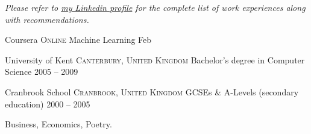 \documentclass[10pt,a4paper]{article}
\begin{document}
\begin{center}
  \emph{Please refer to \href{http://www.linkedin.com/in/sebinsua}{my Linkedin profile} for the complete list of work experiences along with recommendations.}
\end{center}


\spacedhrule{-0.2em}{-0.4em}


\headedsection
  {Coursera}
  {\textsc{Online}} {%
  \headedsubsection
    {Machine Learning}
    {Feb }
    {
  }
}

\headedsection
  {University of Kent}
  {\textsc{Canterbury, United Kingdom}} {%
  \headedsubsection
    {Bachelor's degree in Computer Science}
    {2005 -- 2009}
    {\bodytext{}
  }
}

\headedsection
  {Cranbrook School}
  {\textsc{Cranbrook, United Kingdom}} {%
  \headedsubsection
    {GCSEs \& A-Levels \textnormal{(secondary education)}}
    {2000 -- 2005}
    {\bodytext{}
  }
}

\spacedhrule{0em}{-0.4em}


\inlineheadsection
  {}
  {Business, Economics, Poetry.}
\end{document}
